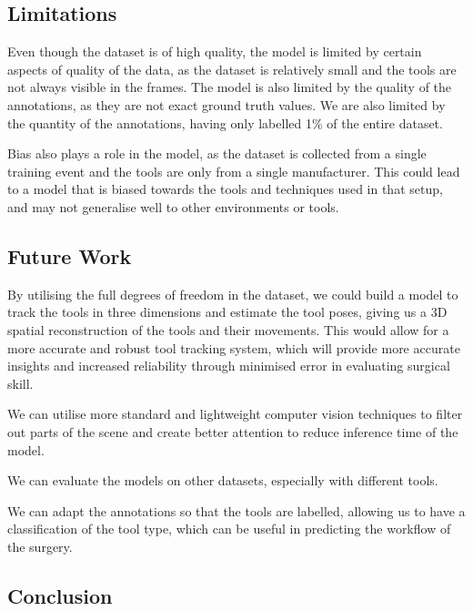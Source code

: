 \subsection{Limitations}

Even though the dataset is of high quality, the model is limited by certain aspects of quality of the data, as the dataset is relatively small and the tools are not always visible in the frames. The model is also limited by the quality of the annotations, as they are not exact ground truth values. We are also limited by the quantity of the annotations, having only labelled 1\% of the entire dataset.

Bias also plays a role in the model, as the dataset is collected from a single training event and the tools are only from a single manufacturer. This could lead to a model that is biased towards the tools and techniques used in that setup, and may not generalise well to other environments or tools.

\subsection{Future Work}

By utilising the full degrees of freedom in the dataset, we could build a model to track the tools in three dimensions and estimate the tool poses, giving us a 3D spatial reconstruction of the tools and their movements. This would allow for a more accurate and robust tool tracking system, which will provide more accurate insights and increased reliability through minimised error in evaluating surgical skill.

We can utilise more standard and lightweight computer vision techniques to filter out parts of the scene and create better attention to reduce inference time of the model.

We can evaluate the models on other datasets, especially with different tools.

We can adapt the annotations so that the tools are labelled, allowing us to have a classification of the tool type, which can be useful in predicting the workflow of the surgery.




\subsection{Conclusion}

